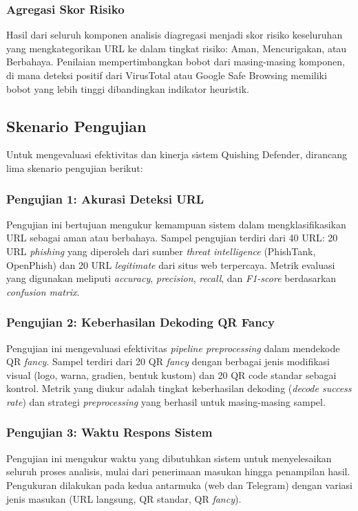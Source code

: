 \documentclass[conference]{IEEEtran}
\begin{document}
\subsubsection{Agregasi Skor Risiko}
Hasil dari seluruh komponen analisis diagregasi menjadi skor risiko keseluruhan yang mengkategorikan URL ke dalam tingkat risiko: Aman, Mencurigakan, atau Berbahaya. Penilaian mempertimbangkan bobot dari masing-masing komponen, di mana deteksi positif dari VirusTotal atau Google Safe Browsing memiliki bobot yang lebih tinggi dibandingkan indikator heuristik.

\subsection{Skenario Pengujian}

Untuk mengevaluasi efektivitas dan kinerja sistem Quishing Defender, dirancang lima skenario pengujian berikut:

\subsubsection{Pengujian 1: Akurasi Deteksi URL}
Pengujian ini bertujuan mengukur kemampuan sistem dalam mengklasifikasikan URL sebagai aman atau berbahaya. Sampel pengujian terdiri dari 40 URL: 20 URL \textit{phishing} yang diperoleh dari sumber \textit{threat intelligence} (PhishTank, OpenPhish) dan 20 URL \textit{legitimate} dari situs web terpercaya. Metrik evaluasi yang digunakan meliputi \textit{accuracy}, \textit{precision}, \textit{recall}, dan \textit{F1-score} berdasarkan \textit{confusion matrix}.

\subsubsection{Pengujian 2: Keberhasilan Dekoding QR Fancy}
Pengujian ini mengevaluasi efektivitas \textit{pipeline preprocessing} dalam mendekode QR \textit{fancy}. Sampel terdiri dari 20 QR \textit{fancy} dengan berbagai jenis modifikasi visual (logo, warna, gradien, bentuk kustom) dan 20 QR code standar sebagai kontrol. Metrik yang diukur adalah tingkat keberhasilan dekoding (\textit{decode success rate}) dan strategi \textit{preprocessing} yang berhasil untuk masing-masing sampel.

\subsubsection{Pengujian 3: Waktu Respons Sistem}
Pengujian ini mengukur waktu yang dibutuhkan sistem untuk menyelesaikan seluruh proses analisis, mulai dari penerimaan masukan hingga penampilan hasil. Pengukuran dilakukan pada kedua antarmuka (web dan Telegram) dengan variasi jenis masukan (URL langsung, QR standar, QR \textit{fancy}).
\end{document}
